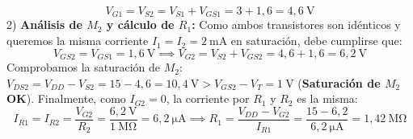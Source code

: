 \begin{ejercicio}
\begin{equation}
    V_{G1} = V_{S2} = V_{S1} + V_{GS1} = 3 + 1{,}6 = 4{,}6\ \si{\volt}
\end{equation}
2) \textbf{Análisis de $M_2$ y cálculo de $R_1$:} Como ambos transistores son idénticos y queremos la misma corriente $I_1 = I_2 = 2\ \si{\milli\ampere}$ en saturación, debe cumplirse que:
\begin{equation}
    V_{GS2} = V_{GS1} = 1{,}6\ \si{\volt} \implies V_{G2} = V_{S2} + V_{GS2} = 4{,}6 + 1{,}6 = 6{,}2\ \si{\volt}
\end{equation}
Comprobamos la saturación de $M_2$: $V_{DS2} = V_{DD} - V_{S2} = 15 - 4{,}6 = 10{,}4\ \si{\volt} > V_{GS2} - V_T = 1\ \si{\volt}$ (\textbf{Saturación de $M_2$ OK}).
Finalmente, como $I_{G2} = 0$, la corriente por $R_1$ y $R_2$ es la misma:
\begin{equation}
    I_{R1} = I_{R2} = \frac{V_{G2}}{R_2} = \frac{6{,}2\ \si{\volt}}{1\ \si{\mega\ohm}} = 6{,}2\ \si{\micro\ampere} \implies R_1 = \frac{V_{DD} - V_{G2}}{I_{R1}} = \frac{15 - 6{,}2}{6{,}2\ \si{\micro\ampere}} = 1{,}42\ \si{\mega\ohm}
\end{equation}
\end{ejercicio}
